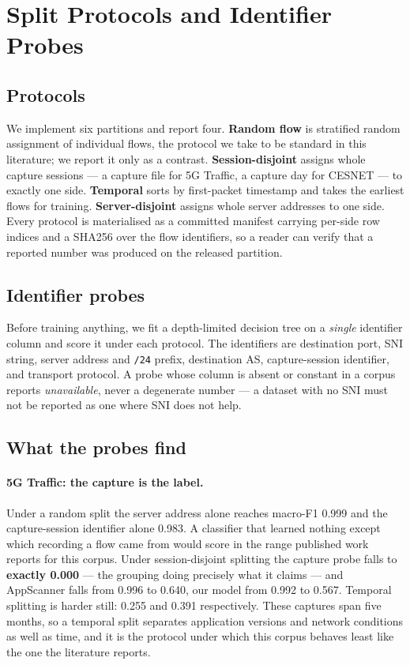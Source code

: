 \section{Split Protocols and Identifier Probes}
\label{sec:protocols}

\subsection{Protocols}

We implement six partitions and report four. \textbf{Random flow} is stratified
random assignment of individual flows, the protocol we take to be standard in
this literature; we report it only as a contrast. \textbf{Session-disjoint}
assigns whole capture sessions --- a capture file for 5G Traffic, a capture day
for CESNET --- to exactly one side. \textbf{Temporal} sorts by first-packet
timestamp and takes the earliest flows for training. \textbf{Server-disjoint}
assigns whole server addresses to one side. Every protocol is materialised as a
committed manifest carrying per-side row indices and a SHA256 over the flow
identifiers, so a reader can verify that a reported number was produced on the
released partition.

\subsection{Identifier probes}

Before training anything, we fit a depth-limited decision tree on a
\emph{single} identifier column and score it under each protocol. The
identifiers are destination port, SNI string, server address and \texttt{/24}
prefix, destination AS, capture-session identifier, and transport protocol. A
probe whose column is absent or constant in a corpus reports
\emph{unavailable}, never a degenerate number --- a dataset with no SNI must
not be reported as one where SNI does not help.



\subsection{What the probes find}

\paragraph{5G Traffic: the capture is the label.} Under a random split the
server address alone reaches macro-F1 0.999 and the capture-session identifier
alone 0.983. A classifier that learned nothing except which recording a flow
came from would score in the range published work reports for this corpus.
Under session-disjoint splitting the capture probe falls to \textbf{exactly
0.000} --- the grouping doing precisely what it claims --- and AppScanner falls
from 0.996 to 0.640, our model from 0.992 to 0.567. Temporal splitting is
harder still: 0.255 and 0.391 respectively. These captures span five months, so
a temporal split separates application versions and network conditions as well
as time, and it is the protocol under which this corpus behaves least like the
one the literature reports.

